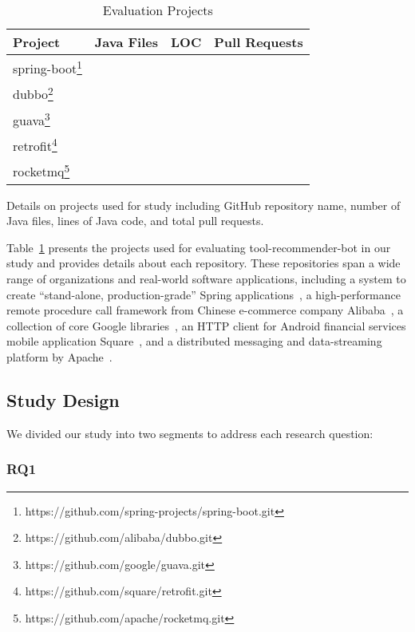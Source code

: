 \documentclass[conference]{IEEEtran}
\newcommand{\tool}{tool-recommender-bot }
\begin{document}
\begin{table}
	\centering
	\caption{Evaluation Projects}
	\begin{tabular}{|l|l|l|c|}
		\hline
		\textbf{Project} & \textbf{Java Files} & \textbf{LOC} & \textbf{Pull Requests} \\
		\hline
		spring-boot\footnote{https://github.com/spring-projects/spring-boot.git} &  &  & \\
		\hline
		dubbo\footnote{https://github.com/alibaba/dubbo.git} &  &  & \\
		\hline
		guava\footnote{https://github.com/google/guava.git}  &  &  & \\
		\hline
		retrofit\footnote{https://github.com/square/retrofit.git}  &  &  & \\
		\hline
		rocketmq\footnote{https://github.com/apache/rocketmq.git}  &  &  & \\
		\hline
		\end{tabular}
	\begin{tablenotes}
        \item[1] Details on projects used for study including GitHub repository name, number of Java files, lines of Java code, and total pull requests.
    \end{tablenotes}
	\label{tools}
\end{table}

Table~\ref{tools} presents the projects used for evaluating \tool in our study and provides details about each repository. These repositories span a wide range of organizations and real-world software applications, including a system to create ``stand-alone, production-grade'' Spring applications~\cite{spring-boot}, a high-performance remote procedure call framework from Chinese e-commerce company Alibaba~\cite{dubbo}, a collection of core Google libraries~\cite{guava}, an HTTP client for Android financial services mobile application Square~\cite{square-retrofit}, and a distributed messaging and data-streaming platform by Apache~\cite{rocketmq}.

\subsection{Study Design}

We divided our study into two segments to address each research question:

\subsubsection{RQ1}
\end{document}
